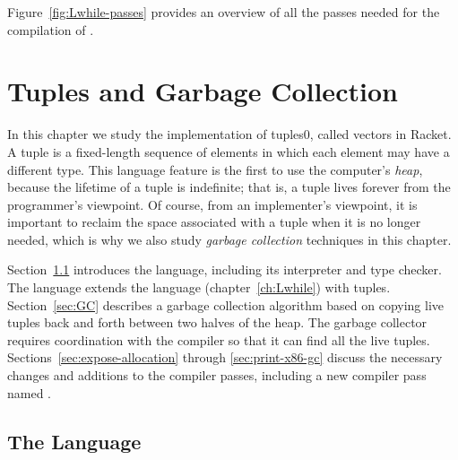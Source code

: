\documentclass[7x10]{TimesAPriori_MIT}%
\def\racketEd{0}
\def\edition{0}
\newcommand{\racket}[1]{{\if\edition\racketEd{#1}\fi}}
\numberwithin{theorem}{chapter}
\numberwithin{definition}{chapter}
\numberwithin{equation}{chapter}
\begin{document}
Figure~\ref{fig:Lwhile-passes} provides an overview of all the passes needed
for the compilation of \LangLoop{}.






\chapter{Tuples and Garbage Collection}
\label{ch:Lvec}
\setcounter{footnote}{0}


In this chapter we study the implementation of tuples\racket{, called
  vectors in Racket}.  A tuple is a fixed-length sequence of elements
in which each element may have a different type.
%
This language feature is the first to use the computer's
\emph{heap}, because the lifetime of a tuple is
indefinite; that is, a tuple lives forever from the programmer's
viewpoint. Of course, from an implementer's viewpoint, it is important
to reclaim the space associated with a tuple when it is no longer
needed, which is why we also study \emph{garbage collection}
 techniques in this chapter.

Section~\ref{sec:r3} introduces the \LangVec{} language, including its
interpreter and type checker. The \LangVec{} language extends the \LangLoop{}
language (chapter~\ref{ch:Lwhile}) with tuples.
%
Section~\ref{sec:GC} describes a garbage collection algorithm based on
copying live tuples back and forth between two halves of the heap. The
garbage collector requires coordination with the compiler so that it
can find all the live tuples.
%
Sections~\ref{sec:expose-allocation} through \ref{sec:print-x86-gc}
discuss the necessary changes and additions to the compiler passes,
including a new compiler pass named .

\section{The \LangVec{} Language}
\label{sec:r3}
\end{document}
